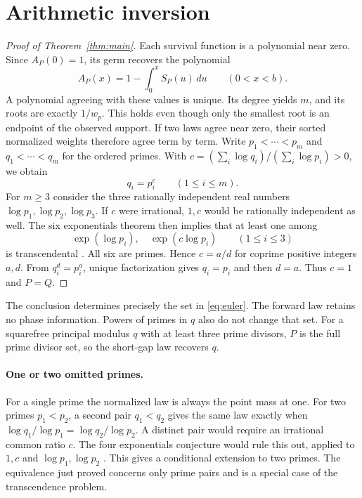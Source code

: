 \documentclass[11pt]{article}
\begin{document}
\section{Arithmetic inversion}
\begin{proof}[Proof of Theorem~\ref{thm:main}]
Each survival function is a polynomial near zero. Since $A_P(0)=1$, its germ
recovers the polynomial
\begin{equation}\label{eq:invert}
 A_P(x)=1-\int_0^x S_P(u)\,du \qquad(0<x<b).
\end{equation}
A polynomial agreeing with these values is unique. Its degree yields $m$, and
its roots are exactly $1/w_p$. This holds even though only the smallest root is
an endpoint of the observed support. If two laws agree near zero, their
sorted normalized weights therefore agree term by term. Write
$p_1<\cdots<p_m$ and $q_1<\cdots<q_m$ for the ordered primes. With
$c=(\sum_i\log q_i)/(\sum_i\log p_i)>0$, we obtain
\[
  q_i=p_i^c\qquad(1\le i\le m).
\]
For $m\ge3$ consider the three rationally independent real numbers
$\log p_1,\log p_2,\log p_3$. If $c$ were irrational, $1,c$ would be
rationally independent as well. The six exponentials theorem then implies
that at least one among
\[
 \exp(\log p_i),\quad \exp(c\log p_i)\qquad (1\le i\le3)
\]
is transcendental \cite{wald}. All six are primes. Hence $c=a/d$ for coprime
positive integers $a,d$. From $q_i^d=p_i^a$, unique factorization gives
$q_i=p_i$ and then $d=a$. Thus $c=1$ and $P=Q$.
\end{proof}

The conclusion determines precisely the set in \eqref{eq:euler}. The forward
law retains no phase information. Powers of primes in $q$ also do not change
that set. For a squarefree principal modulus $q$ with at least three prime
divisors, $P$ is the full prime divisor set, so the short-gap law recovers $q$.

\paragraph{One or two omitted primes.}
For a single prime the normalized law is always the point mass at one.
For two primes $p_1<p_2$, a second pair $q_1<q_2$ gives the same law exactly
when $\log q_1/\log p_1=\log q_2/\log p_2$. A distinct pair would require
an irrational common ratio $c$. The four exponentials conjecture would rule
this out, applied to $1,c$ and $\log p_1,\log p_2$ \cite{wald}.
This gives a conditional extension to two primes. The equivalence just
proved concerns only prime pairs and is a special case of the transcendence
problem.
\end{document}
